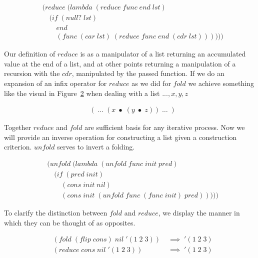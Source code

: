 \begin{figure}[htp]
\footnotesize
\caption{}\label{fig:reduceDef}
\begin{align*}
& (reduce \; (lambda \; (reduce \; func \; end \; lst)
\\& \quad (if \; (null? \; lst)
\\& \qquad end
\\& \qquad (func \; (car \; lst) \; (reduce \; func \; end \; (cdr \; lst))))))
\end{align*}
\end{figure}

Our definition of $reduce$ is as a manipulator of a list returning an
accumulated value at the end of a list, and at other points returning a
manipulation of a recursion with the $cdr$, manipulated by the passed function.
If we do an expansion of an infix operator for $reduce$ as we did for $fold$ we
achieve something like the visual in Figure~\ref{fig:reduceVisual} when dealing
with a list $... , x, y, z$

\begin{figure}[htp]
\footnotesize
\caption{}\label{fig:reduceVisual}
\begin{align*}
& ( \; \dots \; (x \; \bullet \; (y \; \bullet \; z)) \; \dots \; )
\end{align*}
\end{figure}

Together $reduce$ and $fold$ are sufficient basis for any iterative process. Now 
we will provide an inverse operation for constructing a list given a construction 
criterion. $unfold$ serves to invert a folding.

\begin{figure}[htp]
\footnotesize
\caption{}\label{fig:unfoldDef}
\begin{align*}
& (unfold \; (lambda \; (unfold \; func \; init \; pred)
\\& \quad (if \; (pred \; init)
\\& \qquad (cons \; init \; nil)
\\& \qquad (cons \; init \; (unfold \; func \; (func \; init) \; pred)))))
\end{align*}
\end{figure}

To clarify the distinction between $fold$ and $reduce$, we display the manner in 
which they can be thought of as opposites.

\begin{figure}[htp]
\footnotesize
\caption{}\label{fig:foldVsReduce}
\begin{align*}
& (fold \; (flip \; cons) \; nil \; '(1 \; 2 \; 3)) \; &\implies \; '(1 \; 2 \; 3)
\\& (reduce \; cons \; nil \; '(1 \; 2 \; 3)) \; &\implies \; '(1 \; 2 \; 3)
\end{align*}
\end{figure}


